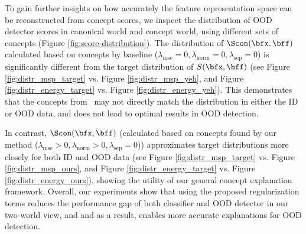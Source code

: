 


To gain further insights on how accurately the feature representation space can be reconstructed from concept scores, we inspect the distribution of OOD detector scores in canonical world and concept world, using different sets of concepts (Figure \ref{fig:score-distribution}).
The distribution of $\Scon(\bfx, \bff)$ calculated based on concepts by baseline ($\lambda_\textrm{mse} = 0, \lambda_\textrm{norm} = 0, \lambda_\textrm{sep} = 0$) is significantly different from the target distribution of $S(\bfx, \bff)$ (see Figure \ref{fig:distr_msp_target} vs. Figure \ref{fig:distr_msp_yeh}, and Figure \ref{fig:distr_energy_target} vs. Figure \ref{fig:distr_energy_yeh}). This demonstrates that the concepts from~\cite{yeh2019completeness} may not directly match the distribution in either the ID or OOD data, and does not lead to optimal results in OOD detection.

In contrast, $\Scon(\bfx, \bff)$ (calculated based on concepts found by our method ($\lambda_\textrm{mse} > 0, \lambda_\textrm{norm} > 0, \lambda_\textrm{sep} = 0$)) approximates target distributions more closely for both ID and OOD data (see Figure \ref{fig:distr_msp_target} vs. Figure \ref{fig:distr_msp_ours}, and Figure \ref{fig:distr_energy_target} vs. Figure \ref{fig:distr_energy_ours}), showing the utility of our general concept explanation framework.
Overall, our experiments show that using the proposed regularization terms reduces the performance gap of both classifier and OOD detector in our two-world view, and and as a result, enables more accurate explanations for OOD detection.


